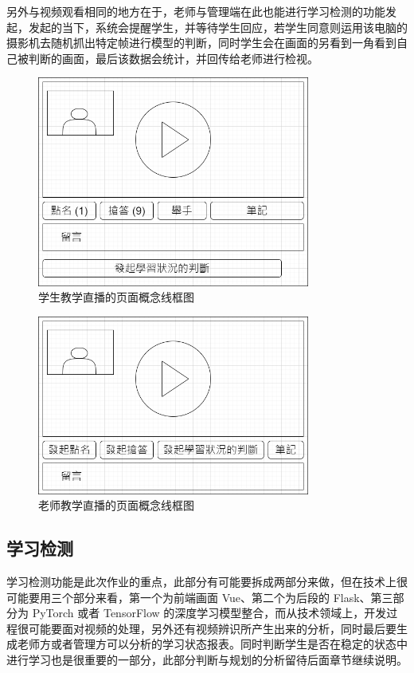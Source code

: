另外与视频观看相同的地方在于，老师与管理端在此也能进行学习检测的功能发起，发起的当下，系统会提醒学生，并等待学生回应，若学生同意则运用该电脑的摄影机去随机抓出特定帧进行模型的判断，同时学生会在画面的另看到一角看到自己被判断的画面，最后该数据会统计，并回传给老师进行检视。

\begin{figure}[htb]
\centering 
\includegraphics[width=0.80\textwidth]{img/ch1m11.png} 
\caption{学生教学直播的页面概念线框图}
\label{Test}
\end{figure}

\begin{figure}[htb]
\centering 
\includegraphics[width=0.80\textwidth]{img/ch1m12.png} 
\caption{老师教学直播的页面概念线框图}
\label{Test}
\end{figure}


\subsection{学习检测}

学习检测功能是此次作业的重点，此部分有可能要拆成两部分来做，但在技术上很可能要用三个部分来看，第一个为前端画面 Vue、第二个为后段的 Flask、第三部分为 PyTorch 或者 TensorFlow 的深度学习模型整合，而从技术领域上，开发过程很可能要面对视频的处理，另外还有视频辨识所产生出来的分析，同时最后要生成老师方或者管理方可以分析的学习状态报表。同时判断学生是否在稳定的状态中进行学习也是很重要的一部分，此部分判断与规划的分析留待后面章节继续说明。

